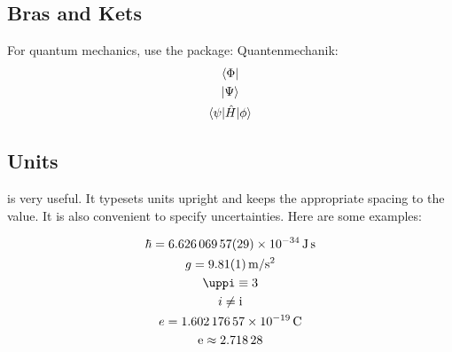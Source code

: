 \subsection{Bras and Kets}
For quantum mechanics, use the  package:
Quantenmechanik:
\begin{gather}
	\bra{\Phi}\\
	\ket{\Psi}\\
	\braket{\psi|\hat{H}|\phi}
\end{gather}

\subsection{Units}
 is very useful. It typesets units upright and keeps the appropriate spacing to the value. It is also convenient to specify uncertainties. Here are some examples:

\begin{gather}
	\hbar = \SI[separate-uncertainty=false]{6.62606957(29)e-34}{\joule\second}\\
	g = \SI{9.81(1)}{\meter \per \s^2}\\
	\pi \equiv 3\\
	i \neq \i\\
	e = \SI{1.60217657e-19}{\coulomb}\\
	\e \approx \num{2.71828}\\
\end{gather}
